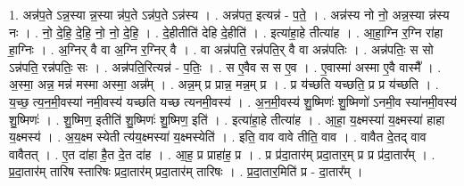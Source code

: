 \documentclass[17pt]{extarticle}
\begin{document}
1. अन्न॑प॒ते ऽन्न॒स्या न्न॒स्या न्न॑प॒ते ऽन्न॑प॒ते ऽन्न॑स्य । . अन्न॑पत॒ इत्यन्न॑ - प॒ते॒ । . अन्न॑स्य नो नो॒ अन्न॒स्या न्न॑स्य नः । . नो॒ दे॒हि॒ दे॒हि॒ नो॒ नो॒ दे॒हि॒ । . दे॒हीतीति॑ देहि दे॒हीति॑ । . इत्या॑हा॒हे तीत्या॑ह । . आ॒हा॒ग्नि र॒ग्नि रा॑हा हा॒ग्निः । . अ॒ग्निर् वै वा अ॒ग्नि र॒ग्निर् वै । . वा अन्न॑पति॒ रन्न॑पति॒र् वै वा अन्न॑पतिः । . अन्न॑पतिः॒ स सो ऽन्न॑पति॒ रन्न॑पतिः॒ सः । . अन्न॑पति॒रित्यन्न॑ - प॒तिः॒ । . स ए॒वैव स स ए॒व । . ए॒वास्मा॑ अस्मा ए॒वै वास्मै᳚ । . अ॒स्मा॒ अन्न॒ मन्न॑ मस्मा अस्मा॒ अन्न᳚म् । . अन्न॒म् प्र प्रान्न॒ मन्न॒म् प्र । . प्र य॑च्छति यच्छति॒ प्र प्र य॑च्छति । . य॒च्छ॒ त्य॒न॒मी॒वस्या॑ नमी॒वस्य॑ यच्छति यच्छ त्यनमी॒वस्य॑ । . अ॒न॒मी॒वस्य॑ शु॒ष्मिणः॑ शु॒ष्मिणो॑ ऽनमी॒व स्या॑नमी॒वस्य॑ शु॒ष्मिणः॑ । . शु॒ष्मिण॒ इतीति॑ शु॒ष्मिणः॑ शु॒ष्मिण॒ इति॑ । . इत्या॑हा॒हे तीत्या॑ह । . आ॒हा॒ य॒क्ष्मस्या॑ य॒क्ष्मस्या॑ हाहा य॒क्ष्मस्य॑ । . अ॒य॒क्ष्म स्येती त्य॑य॒क्ष्मस्या॑ य॒क्ष्मस्येति॑ । . इति॒ वाव वावे तीति॒ वाव । . वावैत दे॒तद् वाव वावैतत् । . ए॒त दा॑हा है॒त दे॒त दा॑ह । . आ॒ह॒ प्र प्राहा॑ह॒ प्र । . प्र प्र॑दा॒तार॑म् प्रदा॒तार॒म् प्र प्र प्र॑दा॒तार᳚म् । . प्र॒दा॒तार॑म् तारिष स्तारिषः प्रदा॒तार॑म् प्रदा॒तार॑म् तारिषः । . प्र॒दा॒तार॒मिति॑ प्र - दा॒तार᳚म् । \newline
\end{document}
